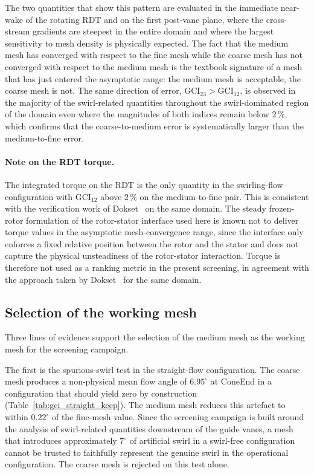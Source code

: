The two quantities that show this pattern are evaluated in the immediate near-wake of the rotating RDT and on the first post-vane plane, where the cross-stream gradients are steepest in the entire domain and where the largest sensitivity to mesh density is physically expected. The fact that the medium mesh has converged with respect to the fine mesh while the coarse mesh has not converged with respect to the medium mesh is the textbook signature of a mesh that has just entered the asymptotic range: the medium mesh is acceptable, the coarse mesh is not. The same direction of error, $\mathrm{GCI}_{23} > \mathrm{GCI}_{12}$, is observed in the majority of the swirl-related quantities throughout the swirl-dominated region of the domain even where the magnitudes of both indices remain below $2\,\%$, which confirms that the coarse-to-medium error is systematically larger than the medium-to-fine error.

\paragraph{Note on the RDT torque.}
The integrated torque on the RDT is the only quantity in the swirling-flow configuration with $\mathrm{GCI}_{12}$ above $2\,\%$ on the medium-to-fine pair. This is consistent with the verification work of Dokset~\cite{Dokset2025} on the same domain. The steady frozen-rotor formulation of the rotor-stator interface used here is known not to deliver torque values in the asymptotic mesh-convergence range, since the interface only enforces a fixed relative position between the rotor and the stator and does not capture the physical unsteadiness of the rotor-stator interaction. Torque is therefore not used as a ranking metric in the present screening, in agreement with the approach taken by Dokset~\cite{Dokset2025} for the same domain.

\subsection{Selection of the working mesh}
\label{sec:gci_pick}

Three lines of evidence support the selection of the medium mesh as the working mesh for the screening campaign.

The first is the spurious-swirl test in the straight-flow configuration. The coarse mesh produces a non-physical mean flow angle of $6.95^\circ$ at ConeEnd in a configuration that should yield zero by construction (Table~\ref{tab:gci_straight_keep}). The medium mesh reduces this artefact to within $0.22^\circ$ of the fine-mesh value. Since the screening campaign is built around the analysis of swirl-related quantities downstream of the guide vanes, a mesh that introduces approximately $7^\circ$ of artificial swirl in a swirl-free configuration cannot be trusted to faithfully represent the genuine swirl in the operational configuration. The coarse mesh is rejected on this test alone.

